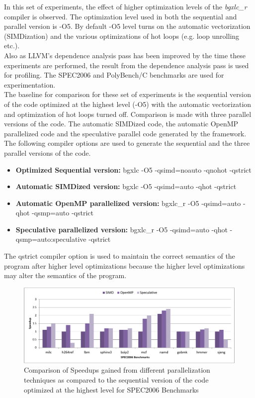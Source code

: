 \documentclass[10pt]{report}          %
\begin{document}
In this set of experiments, the effect of higher optimization levels of the \textit{bgxlc\_r} compiler is observed.  The optimization level used in both the sequential and parallel version is -O5.  By default -O5 level turns on the automatic vectorization (SIMDization) and the various optimizations of hot loops (e.g. loop unrolling etc.).  \\
Also as LLVM's dependence analysis pass has been improved by the time these experiments are performed, the result from the dependence analysis pass is used for profiling.  The SPEC2006 and PolyBench/C benchmarks are used for experimentation.\\
The baseline for comparison for these set of experiments is the sequential version of the code optimized at the highest level (-O5) with the automatic vectorization and optimization of hot loops turned off.  Comparison is made with three parallel versions of the code.  The automatic SIMDized code, the automatic OpenMP parallelized code and the speculative parallel code generated by the framework.  The following compiler options are used to generate the sequential and the three parallel versions of the code. \\

\begin{itemize}
\item \textbf{Optimized Sequential version:} bgxlc -O5 -qsimd=noauto -qnohot -qstrict 
\item \textbf{Automatic SIMDized version:} bgxlc -O5 -qsimd=auto -qhot -qstrict 
\item \textbf{Automatic OpenMP parallelized version:} bgxlc\_r -O5 -qsimd=auto -qhot -qsmp=auto -qstrict 
\item \textbf{Speculative parallelized version:} bgxlc\_r -O5 -qsimd=auto -qhot -qsmp=auto:speculative -qstrict
\end{itemize}

The \-qstrict compiler option is used to maintain the correct semantics of the program after higher level optimizations because the higher level optimizations may alter the semantics of the program. \\

\begin{figure}[h]
\centering
\includegraphics[scale=0.56]{./pdf/spec2006_O5.pdf}
\caption{Comparison of Speedups gained from different parallelization techniques as compared to the sequential version of the code optimized at the highest level for SPEC2006 Benchmarks }
\label{fig:speedup_O5}
\end{figure}
\end{document}
